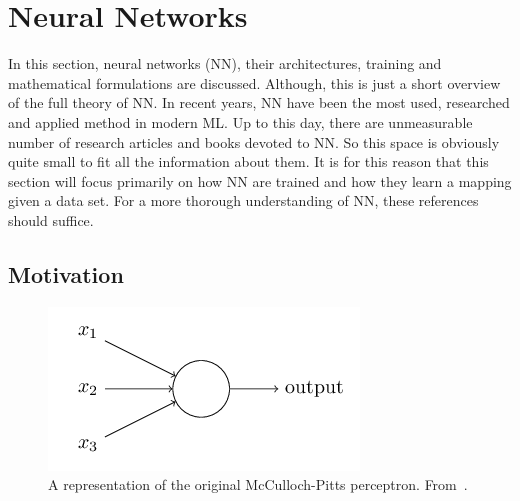 \section{Neural Networks}
In this section, neural networks (NN), their architectures, training and mathematical formulations are discussed. Although, this is just a short overview of the full theory of NN. In recent years, NN have been the most used, researched and applied method in modern ML. Up to this day, there are unmeasurable number of research articles and books devoted to NN. So this space is obviously quite small to fit all the information about them. It is for this reason that this section will focus primarily on how NN are trained and how they learn a mapping given a data set.
For a more thorough understanding of NN, these references~\cite{mehligMachineLearningNeural2021,goodfellowDeepLearning2016,hastieElementsStatisticalLearning2009,bernerModernMathematicsDeep2021} should suffice.

\subsection{Motivation}
\begin{figure}
    \centering
    \includegraphics[scale=0.4]{figuras/capitulo-3/perceptron.png}
    \caption{A representation of the original McCulloch-Pitts perceptron. From~\cite{nielsenNeuralNetworksDeep2015}.}
    \label{fig:perceptron}
\end{figure}

